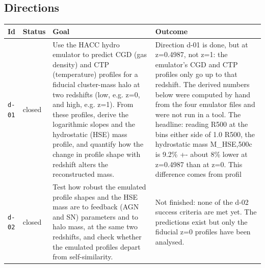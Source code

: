 \documentclass[11pt,a4paper]{article}
\begin{document}
\subsection{Directions}
\begin{longtable}{@{}p{}p{}p{}p{}@{}}
\toprule Id & Status & Goal & Outcome \\ \midrule \endhead
\texttt{d-01} & closed & Use the HACC hydro emulator to predict CGD (gas density) and CTP (temperature) profiles for a fiducial cluster-mass halo at two redshifts (low, e.g. z=0, and high, e.g. z=1). From these profiles, derive the logarithmic slopes and the hydrostatic (HSE) mass profile, and quantify how the change in profile shape with redshift alters the reconstructed mass. & Direction d-01 is done, but at z=0.4987, not z=1: the emulator's CGD and CTP profiles only go up to that redshift. The derived numbers below were computed by hand from the four emulator files and were not run in a tool. The headline: reading R500 at the bins either side of 1.0 R500, the hydrostatic mass M\_HSE,500c is 9.2\% +- about 8\% lower at z=0.4987 than at z=0. This difference comes from profil \\
\texttt{d-02} & closed & Test how robust the emulated profile shapes and the HSE mass are to feedback (AGN and SN) parameters and to halo mass, at the same two redshifts, and check whether the emulated profiles depart from self-similarity. & Not finished: none of the d-02 success criteria are met yet. The predictions exist but only the fiducial z=0 profiles have been analysed.


\end{longtable}
\end{document}
